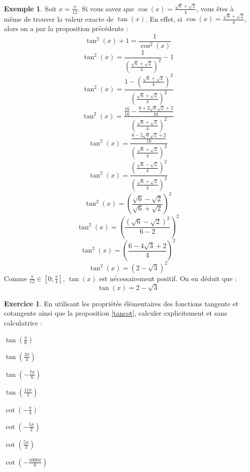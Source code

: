 \documentclass[a4paper,fontsize=13pt]{scrreprt}
\theoremstyle{plain}
\theoremstyle{definition}
\newtheorem{exe}[subsection]{Exemple}
\newtheorem{exo}[subsection]{Exercice}
\begin{document}
\begin{exe}
Soit $x=\frac{\pi}{12}$. Si vous savez que $\cos(x)=\frac{\sqrt{6}+\sqrt{2}}{4}$, vous êtes à même de trouver la valeur exacte de $\tan(x)$. En effet, si $\cos(x)=\frac{\sqrt{6}+\sqrt{2}}{4}$, alors on a par la proposition précédente :
$$\tan^2(x) + 1 = \frac{1}{\cos^2(x)}$$
$$\tan^2(x)= \frac{1}{\left( \frac{\sqrt{6}+\sqrt{2}}{4} \right)^2} -1$$
$$\tan^2(x)= \frac{1-\left( \frac{\sqrt{6}+\sqrt{2}}{4} \right)^2}{\left( \frac{\sqrt{6}+\sqrt{2}}{4} \right)^2}$$
$$\tan^2(x)= \frac{\frac{16}{16}- \frac{6+2\sqrt{6}\sqrt{2}+2}{16} }{\left( \frac{\sqrt{6}+\sqrt{2}}{4} \right)^2}$$
$$\tan^2(x)= \frac{\frac{6-2\sqrt{6}\sqrt{2}+2}{16} }{\left( \frac{\sqrt{6}+\sqrt{2}}{4} \right)^2}$$
$$\tan^2(x)= \frac{\left( \frac{\sqrt{6}-\sqrt{2}}{4} \right)^2}{\left( \frac{\sqrt{6}+\sqrt{2}}{4} \right)^2}$$
$$\tan^2(x)= \left( \frac{\sqrt{6}-\sqrt{2}}{\sqrt{6}+\sqrt{2}}\right)^2$$
$$\tan^2(x)= \left( \frac{\left(\sqrt{6}-\sqrt{2}\right)^2}{6-2}\right)^2$$
$$\tan^2(x)= \left( \frac{6-4\sqrt{3}+2}{4}\right)^2$$
$$\tan^2(x)= \left(2-\sqrt{3} \right)^2$$
Comme $\frac{\pi}{12} \in [0;\frac{\pi}{4}]$, $\tan(x)$ est nécessairement positif. On en déduit que :
$$\tan(x)= 2-\sqrt{3}$$
\end{exe}
\newpage
\begin{exo}
En utilisant les propriétés élémentaires des fonctions tangente et cotangente ainsi que la proposition \ref{tancot}, calculer explicitement et sans calculatrice :
\begin{enumerate}
\begin{multicols}{2}
\item $\tan(\frac{\pi}{6})$
\item $\tan(\frac{3\pi}{4})$
\item $\tan(-\frac{7\pi}{6})$
\item $\tan(\frac{11\pi}{3})$
\item $\cot(-\frac{\pi}{4})$
\item $\cot(-\frac{5\pi}{2})$
\item $\cot(\frac{5\pi}{3})$
\item $\cot(-\frac{1000\pi}{6})$
\end{multicols}
\end{enumerate}
\end{exo}
\end{document}
